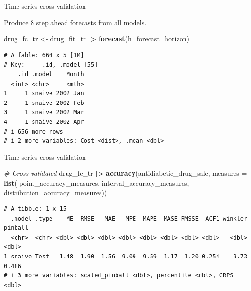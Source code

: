 \documentclass[
  14pt,
  ignorenonframetext,
  aspectratio=169,
]{beamer}
\newenvironment{Shaded}{\begin{snugshade}}{\end{snugshade}}
\newcommand{\AttributeTok}[1]{\textcolor[rgb]{0.13,0.29,0.53}{#1}}
\newcommand{\CommentTok}[1]{\textcolor[rgb]{0.56,0.35,0.01}{\textit{#1}}}
\newcommand{\FunctionTok}[1]{\textcolor[rgb]{0.13,0.29,0.53}{\textbf{#1}}}
\newcommand{\NormalTok}[1]{#1}
\newcommand{\OtherTok}[1]{\textcolor[rgb]{0.56,0.35,0.01}{#1}}
\newcommand{\SpecialCharTok}[1]{\textcolor[rgb]{0.81,0.36,0.00}{\textbf{#1}}}
\renewenvironment{Shaded}{\vspace*{0.15cm}\color{black}\fontsize{10}{10}\sf\begin{snugshade}\color{black}}{\end{snugshade}}
\begin{document}
\begin{frame}[fragile]{Time series cross-validation}
\protect{}\label{time-series-cross-validation-5}
\small

Produce 8 step ahead forecasts from all models.

\begin{Shaded}
\begin{Highlighting}[]
\NormalTok{drug\_fc\_tr }\OtherTok{\textless{}{-}}\NormalTok{ drug\_fit\_tr }\SpecialCharTok{|\textgreater{}} 
  \FunctionTok{forecast}\NormalTok{(}\AttributeTok{h=}\NormalTok{forecast\_horizon)}
\end{Highlighting}
\end{Shaded}

\fontsize{10}{11}\sf

\begin{verbatim}
# A fable: 660 x 5 [1M]
# Key:     .id, .model [55]
    .id .model    Month
  <int> <chr>     <mth>
1     1 snaive 2002 Jan
2     1 snaive 2002 Feb
3     1 snaive 2002 Mar
4     1 snaive 2002 Apr
# i 656 more rows
# i 2 more variables: Cost <dist>, .mean <dbl>
\end{verbatim}
\end{frame}

\begin{frame}[fragile]{Time series cross-validation}
\protect{}\label{time-series-cross-validation-6}
\small

\begin{Shaded}
\begin{Highlighting}[]
\CommentTok{\# Cross{-}validated}
\NormalTok{drug\_fc\_tr }\SpecialCharTok{|\textgreater{}} 
  \FunctionTok{accuracy}\NormalTok{(antidiabetic\_drug\_sale,}
           \AttributeTok{measures =} \FunctionTok{list}\NormalTok{( point\_accuracy\_measures, }
\NormalTok{                            interval\_accuracy\_measures,}
\NormalTok{                            distribution\_accuracy\_measures))}
\end{Highlighting}
\end{Shaded}

\begin{verbatim}
# A tibble: 1 x 15
  .model .type    ME  RMSE   MAE   MPE  MAPE  MASE RMSSE  ACF1 winkler pinball
  <chr>  <chr> <dbl> <dbl> <dbl> <dbl> <dbl> <dbl> <dbl> <dbl>   <dbl>   <dbl>
1 snaive Test   1.48  1.90  1.56  9.09  9.59  1.17  1.20 0.254    9.73   0.486
# i 3 more variables: scaled_pinball <dbl>, percentile <dbl>, CRPS <dbl>
\end{verbatim}
\end{frame}
\end{document}
